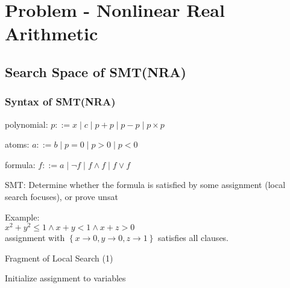 \frame[plain]{\titlepage}

\section{Problem - Nonlinear Real Arithmetic}
\subsection{Search Space of SMT(NRA)}

\begin{frame}
    \frametitle{Syntax of SMT(NRA)}
    
    polynomial: $p ::= x \mid c \mid p + p \mid p - p \mid p \times p$

    atoms: $a ::= b \mid p = 0 \mid p > 0 \mid p < 0$

    formula: $f ::= a \mid \neg f \mid f \wedge f \mid f \vee f $

    \vspace{0.4cm}

    SMT: Determine whether the formula is satisfied by some assignment (local search focuses), or prove unsat

    \vspace{0.4cm}

    Example:
    \\
    $x^2 + y^2 \le 1 \wedge x + y < 1 \wedge x + z > 0$
    \\
    assignment with $\left\{x \rightarrow 0, y \rightarrow 0, z \rightarrow 1\right\}$ satisfies all clauses.
\end{frame}

\begin{frame}{Fragment of Local Search (1)}
    \begin{algorithm}[H]
    \SetAlgoLined
Initialize assignment to variables\;
    \caption{Basic Fragment of Local Search}
    \end{algorithm}
\end{frame}

